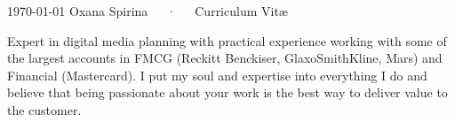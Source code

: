 \documentclass[11pt, a4paper]{awesome-cv}
\begin{document}
\makecvheader[C]

\makecvfooter
  {\today}
  {Oxana Spirina~~~·~~~Curriculum Vitæ}
  {\thepage}


%
%
%
%
%
%
%
%


\begin{cvparagraph}
	Expert in digital media planning with practical experience working with some of the largest accounts in FMCG (Reckitt Benckiser, GlaxoSmithKline, Mars) and Financial (Mastercard). I put my soul and expertise into everything I do and believe that being passionate about your work is the best way to deliver value to the customer.
\end{cvparagraph}
\end{document}
